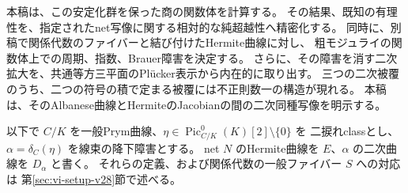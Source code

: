 本稿は、この安定化群を保った商の関数体を計算する。
その結果、既知の有理性を、指定されたnet写像に関する相対的な純超越性へ精密化する。
同時に、別稿\cite{PaperV}で関係代数のファイバーと結び付けたHermite曲線に対し、
粗モジュライの関数体上での周期、指数、Brauer障害を決定する。
さらに、その障害を消す二次拡大を、共通等方三平面のPl\"ucker表示から内在的に取り出す。
三つの二次被覆のうち、二つの符号の積で定まる被覆には不正則数一の構造が現れる。
本稿は、そのAlbanese曲線とHermiteのJacobianの間の二次同種写像を明示する。

以下で $C/K$ を一般Prym曲線、$\eta\in\operatorname{Pic}^0_{C/K}(K)[2]\setminus\{0\}$ を
二捩れclassとし、$\alpha=\delta_C(\eta)$ を線束の降下障害とする。
net $N$ のHermite曲線を $E$、$\alpha$ の二次曲線を $D_\alpha$ と書く。
それらの定義、および関係代数の一般ファイバー $S$ への対応は
第\ref{sec:vi-setup-v28}節で述べる。

